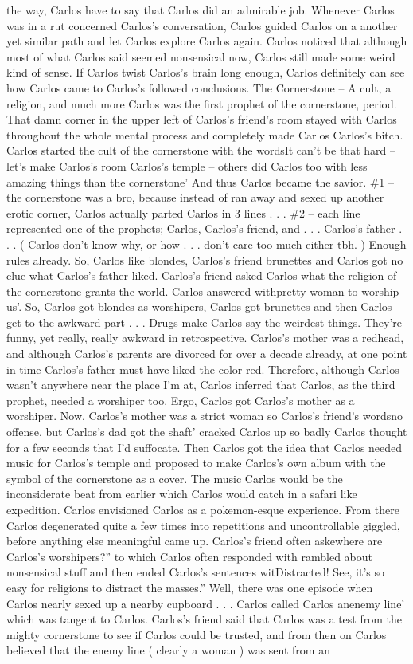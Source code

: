\documentclass[12pt]{book}
\begin{document}
the way, Carlos have to say that Carlos did an admirable job. Whenever Carlos was in a rut concerned Carlos's conversation, Carlos guided Carlos on a another yet similar path and let Carlos explore Carlos again. Carlos noticed that although most of what Carlos said seemed nonsensical now, Carlos still made some weird kind of sense. If Carlos twist Carlos's brain long enough, Carlos definitely can see how Carlos came to Carlos's followed conclusions. The Cornerstone -- A cult, a religion, and much more Carlos was the first prophet of the cornerstone, period. That damn corner in the upper left of Carlos's friend's room stayed with Carlos throughout the whole mental process and completely made Carlos Carlos's bitch. Carlos started the cult of the cornerstone with the wordsIt can't be that hard -- let's make Carlos's room Carlos's temple -- others did Carlos too with less amazing things than the cornerstone' And thus Carlos became the savior. \#1 -- the cornerstone was a bro, because instead of ran away and sexed up another erotic corner, Carlos actually parted Carlos in 3 lines . . .  \#2 -- each line represented one of the prophets; Carlos, Carlos's friend, and . . .  Carlos's father . . .  ( Carlos don't know why, or how . . .  don't care too much either tbh. ) Enough rules already. So, Carlos like blondes, Carlos's friend brunettes and Carlos got no clue what Carlos's father liked. Carlos's friend asked Carlos what the religion of the cornerstone grants the world. Carlos answered withpretty woman to worship us'. So, Carlos got blondes as worshipers, Carlos got brunettes and then Carlos get to the awkward part . . .  Drugs make Carlos say the weirdest things. They're funny, yet really, really awkward in retrospective. Carlos's mother was a redhead, and although Carlos's parents are divorced for over a decade already, at one point in time Carlos's father must have liked the color red. Therefore, although Carlos wasn't anywhere near the place I'm at, Carlos inferred that Carlos, as the third prophet, needed a worshiper too. Ergo, Carlos got Carlos's mother as a worshiper. Now, Carlos's mother was a strict woman so Carlos's friend's wordsno offense, but Carlos's dad got the shaft' cracked Carlos up so badly Carlos thought for a few seconds that I'd suffocate. Then Carlos got the idea that Carlos needed music for Carlos's temple and proposed to make Carlos's own album with the symbol of the cornerstone as a cover. The music Carlos would be the inconsiderate beat from earlier which Carlos would catch in a safari like expedition. Carlos envisioned Carlos as a pokemon-esque experience. From there Carlos degenerated quite a few times into repetitions and uncontrollable giggled, before anything else meaningful came up. Carlos's friend often askewhere are Carlos's worshipers?'' to which Carlos often responded with rambled about nonsensical stuff and then ended Carlos's sentences witDistracted! See, it's so easy for religions to distract the masses.'' Well, there was one episode when Carlos nearly sexed up a nearby cupboard . . .  Carlos called Carlos anenemy line' which was tangent to Carlos. Carlos's friend said that Carlos was a test from the mighty cornerstone to see if Carlos could be trusted, and from then on Carlos believed that the enemy line ( clearly a woman ) was sent from an 
\end{document}
